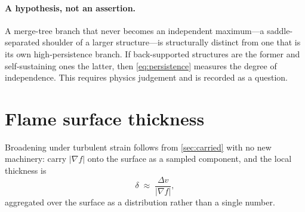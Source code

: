 \paragraph{A hypothesis, not an assertion.} A merge-tree branch that never
becomes an independent maximum---a saddle-separated shoulder of a larger
structure---is structurally distinct from one that is its own high-persistence
branch. If back-supported structures are the former and self-sustaining ones the
latter, then \cref{eq:persistence} measures the degree of independence. This
requires physics judgement and is recorded as a question.

\section{Flame surface thickness}

Broadening under turbulent strain follows from \cref{sec:carried} with no new
machinery: carry $|\nabla f|$ onto the surface as a sampled component, and the
local thickness is
\begin{equation}
  \delta \;\approx\; \frac{\Delta v}{|\nabla f|},
  \label{eq:thickness}
\end{equation}
aggregated over the surface as a distribution rather than a single number.
